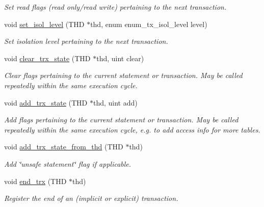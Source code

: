 \begin{DoxyCompactItemize}
\begin{DoxyCompactList}\small\item\em Set read flags (read only/read write) pertaining to the next transaction. \end{DoxyCompactList}\item 
void \mbox{\hyperlink{classTransaction__state__tracker_aaa609102617808d57f15dbe92a278019}{set\+\_\+isol\+\_\+level}} (T\+HD $\ast$thd, enum enum\+\_\+tx\+\_\+isol\+\_\+level level)
\begin{DoxyCompactList}\small\item\em Set isolation level pertaining to the next transaction. \end{DoxyCompactList}\item 
void \mbox{\hyperlink{classTransaction__state__tracker_aa8a01939d3da4f3e87e5b833f79b635f}{clear\+\_\+trx\+\_\+state}} (T\+HD $\ast$thd, uint clear)
\begin{DoxyCompactList}\small\item\em Clear flags pertaining to the current statement or transaction. May be called repeatedly within the same execution cycle. \end{DoxyCompactList}\item 
void \mbox{\hyperlink{classTransaction__state__tracker_a40392c989a5a9f32826f07bcb14c11b2}{add\+\_\+trx\+\_\+state}} (T\+HD $\ast$thd, uint add)
\begin{DoxyCompactList}\small\item\em Add flags pertaining to the current statement or transaction. May be called repeatedly within the same execution cycle, e.\+g. to add access info for more tables. \end{DoxyCompactList}\item 
void \mbox{\hyperlink{classTransaction__state__tracker_ae374c15ed3eccd93e4d59501e70b4f9f}{add\+\_\+trx\+\_\+state\+\_\+from\+\_\+thd}} (T\+HD $\ast$thd)
\begin{DoxyCompactList}\small\item\em Add \char`\"{}unsafe statement\char`\"{} flag if applicable. \end{DoxyCompactList}\item 
void \mbox{\hyperlink{classTransaction__state__tracker_a6c702422b28c51ab3747a4f7fb45fd96}{end\+\_\+trx}} (T\+HD $\ast$thd)
\begin{DoxyCompactList}\small\item\em Register the end of an (implicit or explicit) transaction. \end{DoxyCompactList}\item 

\end{DoxyCompactItemize}
